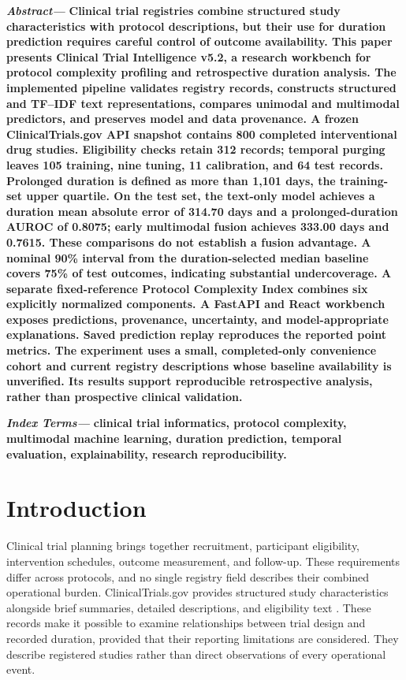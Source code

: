 \documentclass[10pt,letterpaper,twocolumn]{article}
\begin{document}
\noindent
{\bfseries\itshape Abstract—}
{\bfseries
Clinical trial registries combine structured study characteristics with protocol descriptions, but their use for duration prediction requires careful control of outcome availability. This paper presents Clinical Trial Intelligence v5.2, a research workbench for protocol complexity profiling and retrospective duration analysis. The implemented pipeline validates registry records, constructs structured and TF--IDF text representations, compares unimodal and multimodal predictors, and preserves model and data provenance. A frozen ClinicalTrials.gov API snapshot contains 800 completed interventional drug studies. Eligibility checks retain 312 records; temporal purging leaves 105 training, nine tuning, 11 calibration, and 64 test records. Prolonged duration is defined as more than 1,101 days, the training-set upper quartile. On the test set, the text-only model achieves a duration mean absolute error of 314.70 days and a prolonged-duration AUROC of 0.8075; early multimodal fusion achieves 333.00 days and 0.7615. These comparisons do not establish a fusion advantage. A nominal 90\% interval from the duration-selected median baseline covers 75\% of test outcomes, indicating substantial undercoverage. A separate fixed-reference Protocol Complexity Index combines six explicitly normalized components. A FastAPI and React workbench exposes predictions, provenance, uncertainty, and model-appropriate explanations. Saved prediction replay reproduces the reported point metrics. The experiment uses a small, completed-only convenience cohort and current registry descriptions whose baseline availability is unverified. Its results support reproducible retrospective analysis, rather than prospective clinical validation.
}

\vspace{2pt}

\noindent
{\bfseries\itshape Index Terms—}
{\bfseries clinical trial informatics, protocol complexity, multimodal machine learning, duration prediction, temporal evaluation, explainability, research reproducibility.}

\vspace{8pt}

\section{Introduction}

Clinical trial planning brings together recruitment, participant eligibility, intervention schedules, outcome measurement, and follow-up. These requirements differ across protocols, and no single registry field describes their combined operational burden. ClinicalTrials.gov provides structured study characteristics alongside brief summaries, detailed descriptions, and eligibility text \cite{clinicaltrials}. These records make it possible to examine relationships between trial design and recorded duration, provided that their reporting limitations are considered. They describe registered studies rather than direct observations of every operational event.
\end{document}
